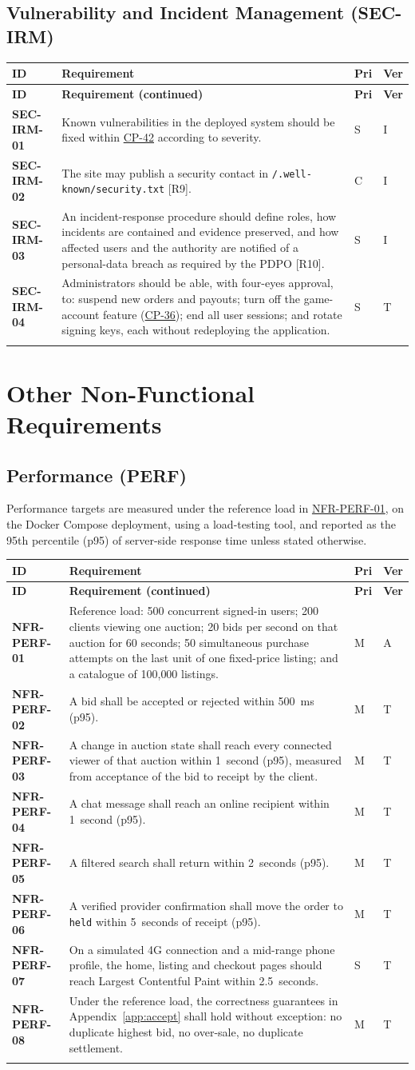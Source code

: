 \documentclass[11pt,a4paper]{report}
\makeatletter
\newenvironment{reqs}{%
  \small
  \begin{longtable}{@{}>{\raggedright\arraybackslash}p{2.35cm}
                       >{\raggedright\arraybackslash}p{10.3cm}
                       >{\centering\arraybackslash}p{0.7cm}
                       >{\centering\arraybackslash}p{0.7cm}@{}}
  \toprule
  \textbf{ID} & \textbf{Requirement} & \textbf{Pri} & \textbf{Ver} \\
  \midrule
  \endfirsthead
  \toprule
  \textbf{ID} & \textbf{Requirement (continued)} & \textbf{Pri} & \textbf{Ver} \\
  \midrule
  \endhead
  \bottomrule
  \endfoot
}{\end{longtable}}
\newcommand{\req}[5]{\leavevmode\textbf{#1}\hypertarget{#1}{} & #5 & #2 & #3 \\ \addlinespace[2pt]}
\newcommand{\rr}[1]{\hyperlink{#1}{#1}}
\newcommand{\cp}[1]{\hyperlink{#1}{#1}}
\makeatother
\begin{document}
\section{Vulnerability and Incident Management (SEC-IRM)}
\begin{reqs}
\req{SEC-IRM-01}{S}{I}{new}{Known vulnerabilities in the deployed system should be fixed within \cp{CP-42} according to severity.}
\req{SEC-IRM-02}{C}{I}{new}{The site may publish a security contact in \texttt{/.well-known/security.txt} [R9].}
\req{SEC-IRM-03}{S}{I}{new}{An incident-response procedure should define roles, how incidents are contained and evidence preserved, and how affected users and the authority are notified of a personal-data breach as required by the PDPO [R10].}
\req{SEC-IRM-04}{S}{T}{new}{Administrators should be able, with four-eyes approval, to: suspend new orders and payouts; turn off the game-account feature (\cp{CP-36}); end all user sessions; and rotate signing keys, each without redeploying the application.}
\end{reqs}
\chapter{Other Non-Functional Requirements}
\label{ch:nfr}

\section{Performance (PERF)}
Performance targets are measured under the reference load in \rr{NFR-PERF-01}, on the Docker Compose deployment, using a load-testing tool, and reported as the 95th percentile (p95) of server-side response time unless stated otherwise.
\begin{reqs}
\req{NFR-PERF-01}{M}{A}{new}{Reference load: 500 concurrent signed-in users; 200 clients viewing one auction; 20 bids per second on that auction for 60 seconds; 50 simultaneous purchase attempts on the last unit of one fixed-price listing; and a catalogue of 100{,}000 listings.}
\req{NFR-PERF-02}{M}{T}{NFR-1}{A bid shall be accepted or rejected within 500~ms (p95).}
\req{NFR-PERF-03}{M}{T}{NFR-2}{A change in auction state shall reach every connected viewer of that auction within 1~second (p95), measured from acceptance of the bid to receipt by the client.}
\req{NFR-PERF-04}{M}{T}{new}{A chat message shall reach an online recipient within 1~second (p95).}
\req{NFR-PERF-05}{M}{T}{NFR-3}{A filtered search shall return within 2~seconds (p95).}
\req{NFR-PERF-06}{M}{T}{new}{A verified provider confirmation shall move the order to \texttt{held} within 5~seconds of receipt (p95).}
\req{NFR-PERF-07}{S}{T}{new}{On a simulated 4G connection and a mid-range phone profile, the home, listing and checkout pages should reach Largest Contentful Paint within 2.5~seconds.}
\req{NFR-PERF-08}{M}{T}{new}{Under the reference load, the correctness guarantees in Appendix~\ref{app:accept} shall hold without exception: no duplicate highest bid, no over-sale, no duplicate settlement.}
\end{reqs}
\end{document}
